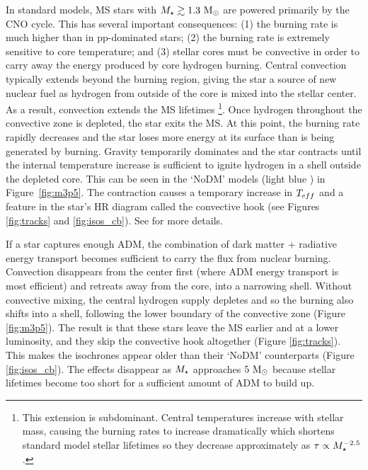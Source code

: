 \documentclass[useAMS,usenatbib]{mnras}
\begin{document}
  In standard models, MS stars with $M_{\star} \gtrsim 1.3 \ \mathrm{M}_{\odot}$ are powered primarily by the CNO cycle.
  This has several important consequences:
  (1) the burning rate is much higher than in pp-dominated stars;
  (2) the burning rate is extremely sensitive to core temperature;
  and (3) stellar cores must be convective in order to carry away the
  energy produced by core hydrogen burning.
  Central convection typically extends beyond the burning region,
  giving the star a source of new nuclear fuel as hydrogen from outside of the
  core is mixed into the stellar center.
  As a result, convection extends the MS lifetimes
  \footnote{This extension is subdominant. Central temperatures increase with stellar mass, causing the burning rates to increase dramatically which shortens standard model stellar lifetimes so they decrease approximately as $\tau \propto M_{\star}^{-2.5}$.}.
  Once hydrogen throughout the convective zone is depleted, the star exits the MS.
  At this point, the burning rate rapidly decreases and
  the star loses more energy at its surface than is being generated by burning.
  Gravity temporarily dominates and the star contracts until the
  internal temperature increase is sufficient to ignite hydrogen in a shell
  outside the depleted core.
  This can be seen in the `NoDM' models (light blue  )
  in Figure~\ref{fig:m3p5}. 
  The contraction causes a temporary increase in
  $T_{eff}$ and a feature in the star's HR diagram called the convective hook (see Figures \ref{fig:tracks} and \ref{fig:isos_cb}).
  See \citet{Pols1990StellarEvolution} for more details.


  If a star captures enough ADM, the combination of dark matter + radiative energy transport becomes sufficient to carry the flux from nuclear burning. Convection disappears from the center first (where ADM energy transport is most efficient) and retreats away from the core, into a narrowing shell. Without convective mixing, the central hydrogen supply depletes and so the burning also shifts into a shell, following the lower boundary of the convective zone (Figure \ref{fig:m3p5}). The result is that these stars leave the MS earlier and at a lower luminosity, and they skip the convective hook altogether (Figure \ref{fig:tracks}). This makes the isochrones appear older than their `NoDM' counterparts (Figure \ref{fig:isos_cb}). The effects disappear as $M_{\star}$ approaches $5 \ \mathrm{M}_{\odot}$ because stellar lifetimes become too short for a sufficient amount of ADM to build up.
\end{document}
